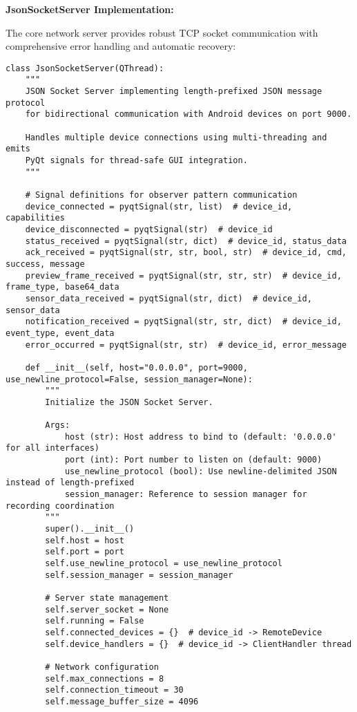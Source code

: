 \documentclass[11pt,a4paper]{article}
\begin{document}
\textbf{JsonSocketServer Implementation:}

The core network server provides robust TCP socket communication with comprehensive error handling and automatic
recovery:

\begin{verbatim}
class JsonSocketServer(QThread):
    """
    JSON Socket Server implementing length-prefixed JSON message protocol
    for bidirectional communication with Android devices on port 9000.

    Handles multiple device connections using multi-threading and emits
    PyQt signals for thread-safe GUI integration.
    """

    # Signal definitions for observer pattern communication
    device_connected = pyqtSignal(str, list)  # device_id, capabilities
    device_disconnected = pyqtSignal(str)  # device_id
    status_received = pyqtSignal(str, dict)  # device_id, status_data
    ack_received = pyqtSignal(str, str, bool, str)  # device_id, cmd, success, message
    preview_frame_received = pyqtSignal(str, str, str)  # device_id, frame_type, base64_data
    sensor_data_received = pyqtSignal(str, dict)  # device_id, sensor_data
    notification_received = pyqtSignal(str, str, dict)  # device_id, event_type, event_data
    error_occurred = pyqtSignal(str, str)  # device_id, error_message

    def __init__(self, host="0.0.0.0", port=9000, use_newline_protocol=False, session_manager=None):
        """
        Initialize the JSON Socket Server.

        Args:
            host (str): Host address to bind to (default: '0.0.0.0' for all interfaces)
            port (int): Port number to listen on (default: 9000)
            use_newline_protocol (bool): Use newline-delimited JSON instead of length-prefixed
            session_manager: Reference to session manager for recording coordination
        """
        super().__init__()
        self.host = host
        self.port = port
        self.use_newline_protocol = use_newline_protocol
        self.session_manager = session_manager

        # Server state management
        self.server_socket = None
        self.running = False
        self.connected_devices = {}  # device_id -> RemoteDevice
        self.device_handlers = {}  # device_id -> ClientHandler thread

        # Network configuration
        self.max_connections = 8
        self.connection_timeout = 30
        self.message_buffer_size = 4096


\end{verbatim}
\end{document}
